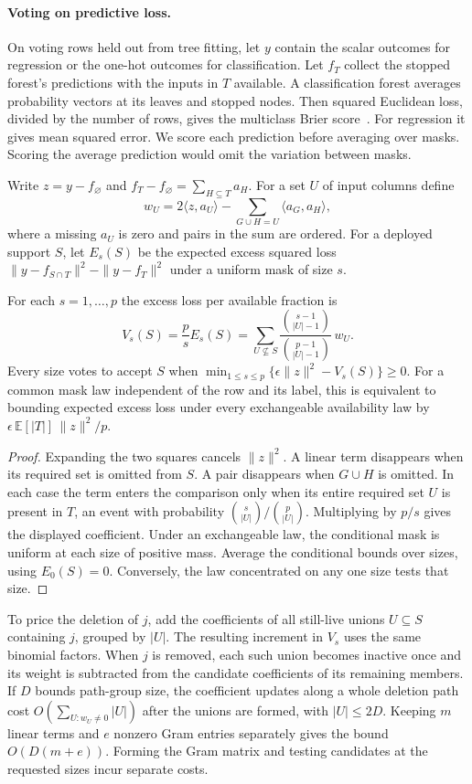 \paragraph{Voting on predictive loss.}
On voting rows held out from tree fitting, let $y$ contain the scalar outcomes
for regression or the one-hot outcomes for classification. Let $f_T$ collect
the stopped forest's predictions with the inputs in $T$ available. A
classification forest averages probability vectors at its leaves and stopped
nodes. Then squared Euclidean loss, divided by the number of rows, gives the
multiclass Brier score~\citep{gneiting2007proper}. For regression it gives
mean squared error. We score each prediction before averaging over masks.
Scoring the average prediction would omit the variation between masks.

Write $z=y-f_\varnothing$ and $f_T-f_\varnothing=\sum_{H\subseteq T}a_H$.
For a set $U$ of input columns define
\[
 w_U=2\langle z,a_U\rangle-
       \sum_{G\cup H=U}\langle a_G,a_H\rangle ,
\]
where a missing $a_U$ is zero and pairs in the sum are ordered. For a
deployed support $S$, let $E_s(S)$ be the expected excess squared loss
$\|y-f_{S\cap T}\|^2-\|y-f_T\|^2$ under a uniform mask of size $s$.

\begin{proposition}
For each $s=1,\ldots,p$ the excess loss per available fraction is
\[
 V_s(S)=\frac{p}{s}E_s(S)=
 \sum_{U\not\subseteq S}
   \frac{\binom{s-1}{|U|-1}}{\binom{p-1}{|U|-1}}\,w_U .
\]
Every size votes to accept $S$ when
$\min_{1\le s\le p}\{\epsilon\|z\|^2-V_s(S)\}\ge0$.
For a common mask law independent of the row and its label, this is equivalent
to bounding expected excess loss under every exchangeable availability law by
$\epsilon\,\mathbb E[|T|]\,\|z\|^2/p$.
\end{proposition}
\begin{proof}
Expanding the two squares cancels $\|z\|^2$. A linear term disappears when
its required set is omitted from $S$. A pair disappears when $G\cup H$
is omitted. In each case the term enters the comparison only when its entire
required set $U$ is present in $T$, an event with probability
$\binom{s}{|U|}/\binom{p}{|U|}$. Multiplying by $p/s$ gives the displayed
coefficient. Under an exchangeable law, the conditional mask is uniform at
each size of positive mass. Average the conditional bounds over sizes, using
$E_0(S)=0$. Conversely, the law concentrated on any one size tests that size.
\end{proof}

To price the deletion of $j$, add the coefficients of all still-live unions
$U\subseteq S$ containing $j$, grouped by $|U|$. The resulting increment in
$V_s$ uses the same binomial factors. When $j$ is removed, each such union
becomes inactive once and its weight is subtracted from the candidate
coefficients of its remaining members. If $D$ bounds path-group size, the
coefficient updates along a whole deletion path cost
$O(\sum_{U:w_U\ne0}|U|)$ after the unions are formed, with $|U|\le2D$.
Keeping $m$ linear terms and $e$ nonzero Gram entries separately gives the
bound $O(D(m+e))$. Forming the Gram matrix and testing candidates at the
requested sizes incur separate costs.

